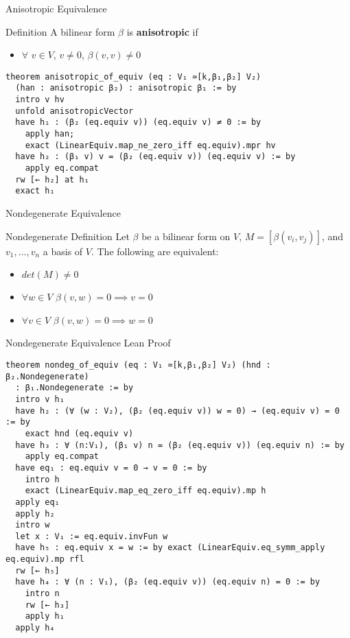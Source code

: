 \documentclass[svgnames]{beamer}
\begin{document}
\begin{frame}[label={sec:proof_comparison},fragile]{Anisotropic Equivalence}
\begin{block}{Definition}
A bilinear form $\beta$ is \textbf{anisotropic} if
\begin{itemize}
    \item $\forall$ $v \in V$, $v\ne 0$, $\beta (v,v) \ne 0$
\end{itemize}
\end{block}
\pause
\begin{itemize}
\end{itemize}
{\scriptsize
\begin{verbatim}
theorem anisotropic_of_equiv (eq : V₁ ≃[k,β₁,β₂] V₂) 
  (han : anisotropic β₂) : anisotropic β₁ := by
  intro v hv
  unfold anisotropicVector
  have h₁ : (β₂ (eq.equiv v)) (eq.equiv v) ≠ 0 := by
    apply han;
    exact (LinearEquiv.map_ne_zero_iff eq.equiv).mpr hv
  have h₂ : (β₁ v) v = (β₂ (eq.equiv v)) (eq.equiv v) := by 
    apply eq.compat
  rw [← h₂] at h₁
  exact h₁
\end{verbatim}
}
\end{frame}

\begin{frame}[label={sec:proof_comparison},fragile]{Nondegenerate Equivalence}
\begin{block}{Nondegenerate Definition}
Let $\beta$ be a bilinear form on $V$, $M=[\beta(v_i,v_j)]$, and $v_1, . . . , v_n$ a basis of $V$. The following are equivalent:
\begin{itemize}
    \item $det(M) \neq 0$
    \item $\forall w \in V $ $\beta (v,w) = 0 \implies v=0$
    \item $\forall v \in V $ $\beta (v,w) = 0 \implies w=0$
\end{itemize}
\end{block}
\end{frame}

\begin{frame}[label={sec:proof_comparison},fragile]{Nondegenerate Equivalence Lean Proof}
\begin{itemize}
\end{itemize}
{\tiny
\begin{verbatim}
theorem nondeg_of_equiv (eq : V₁ ≃[k,β₁,β₂] V₂) (hnd : β₂.Nondegenerate)
  : β₁.Nondegenerate := by
  intro v h₁
  have h₂ : (∀ (w : V₂), (β₂ (eq.equiv v)) w = 0) → (eq.equiv v) = 0 := by
    exact hnd (eq.equiv v)
  have h₃ : ∀ (n:V₁), (β₁ v) n = (β₂ (eq.equiv v)) (eq.equiv n) := by
    apply eq.compat
  have eq₁ : eq.equiv v = 0 → v = 0 := by
    intro h
    exact (LinearEquiv.map_eq_zero_iff eq.equiv).mp h
  apply eq₁
  apply h₂
  intro w
  let x : V₁ := eq.equiv.invFun w
  have h₅ : eq.equiv x = w := by exact (LinearEquiv.eq_symm_apply eq.equiv).mp rfl
  rw [← h₅]
  have h₄ : ∀ (n : V₁), (β₂ (eq.equiv v)) (eq.equiv n) = 0 := by
    intro n
    rw [← h₃]
    apply h₁
  apply h₄
\end{verbatim}
}
\end{frame}
\end{document}
